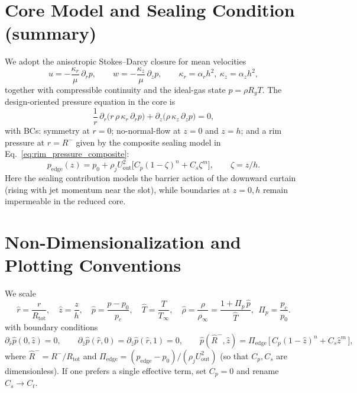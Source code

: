 \documentclass[11pt,a4paper]{article}
\begin{document}
\section{Core Model and Sealing Condition (summary)}
We adopt the anisotropic Stokes--Darcy closure for mean velocities
\begin{equation}
  u = -\frac{\kappa_r}{\mu}\,\partial_r p,\qquad
  w = -\frac{\kappa_z}{\mu}\,\partial_z p,\qquad
  \kappa_r=\alpha_r h^2,\ \kappa_z=\alpha_z h^2,
\end{equation}
together with compressible continuity and the ideal-gas state $p=\rho R_g T$.
The design-oriented pressure equation in the core is
\begin{equation}
  \frac{1}{r}\,\partial_r\!\big(r\,\rho\,\kappa_r\,\partial_r p\big)
  +\partial_z\!\big(\rho\,\kappa_z\,\partial_z p\big)=0,
\end{equation}
with BCs: symmetry at $r=0$; no-normal-flow at $z=0$ and $z=h$; and a rim pressure
at $r=R^{-}$ given by the composite sealing model in
Eq.~\eqref{eq:rim_pressure_composite}:
\begin{equation}
  p_{\mathrm{edge}}(z) = p_0 + \rho_j U_{\mathrm{out}}^2
  \big[ C_p(1-\zeta)^{n} + C_s \zeta^{m} \big], \qquad \zeta=z/h.
\end{equation}
Here the sealing contribution models the barrier action of the downward curtain
(rising with jet momentum near the slot), while boundaries at $z=0,h$ remain
impermeable in the reduced core.



\section{Non-Dimensionalization and Plotting Conventions}
We scale
\begin{equation}
  \hat r=\frac{r}{R_{\mathrm{tot}}},\quad
  \hat z=\frac{z}{h},\quad
  \hat p=\frac{p-p_0}{p_c},\quad
  \hat T=\frac{T}{T_\infty},\quad
  \hat\rho=\frac{\rho}{\rho_\infty}=\frac{1+\Pi_p\,\hat p}{\hat T},\ \ \Pi_p=\frac{p_c}{p_0}.
\end{equation}
with boundary conditions
\begin{equation}
  \partial_{\hat r}\hat p(0,\hat z)=0,\qquad
  \partial_{\hat z}\hat p(\hat r,0)=\partial_{\hat z}\hat p(\hat r,1)=0,\qquad
  \hat p(\hat R^{-},\hat z)=
  \Pi_{\mathrm{edge}}\,
  \big[\, C_p (1-\hat z)^{n} + C_s \hat z^{m} \,\big],
\end{equation}
where $\hat R^{-}=R^{-}/R_{\mathrm{tot}}$ and
$\Pi_{\mathrm{edge}}=(p_{\mathrm{edge}}-p_0)/(\rho_j U_{\mathrm{out}}^2)$ (so that
$C_p,C_s$ are dimensionless). If one prefers a single effective term,
set $C_p=0$ and rename $C_s\to C_t$.
\end{document}
